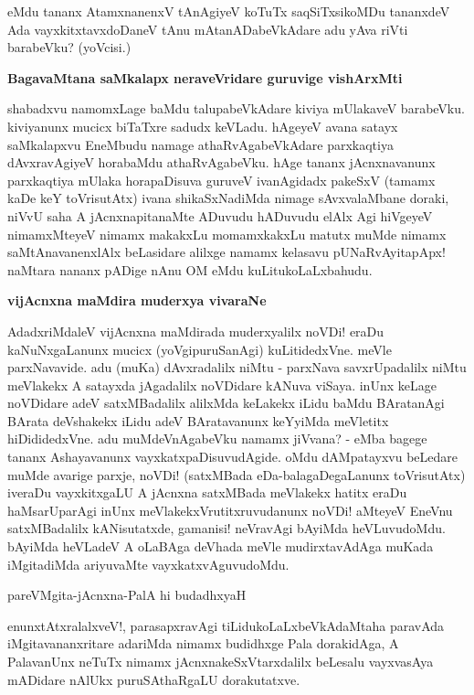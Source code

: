 \noindent
eMdu tananx AtamxnanenxV tAnAgiyeV koTuTx saqSiTxsikoMDu tananxdeV Ada vayxkitxtavxdoDaneV tAnu mAta\-nADa\-beVkAdare adu yAva riVti barabeVku? (yoVcisi.)

{\bigskip
\noindent
{\large\bf BagavaMtana saMkalapx neraveVridare guruvige vishArxMti}}\label{page71}
\medskip

\noindent
shabadxvu namomxLage baMdu talupabeVkAdare kiviya mUlakaveV barabeVku. kiviyanunx mucicx biTaTxre sadudx \-keVLadu. hAgeyeV avana satayx saMkalapxvu EneMbudu namage athaRvAgabeVkAdare parxkaqtiya dAvxra\-vAgiyeV horabaMdu athaRvAgabeVku. hAge tananx jAcnxnavanunx parxkaqtiya mUlaka horapaDisuva guru\-veV ivanAgidadx pakeSxV (tamamx kaDe keY toVrisutAtx) ivana shikaSxNadiMda nimage sAvxvalaMbane doraki, niVvU saha A jAcnxna\-pita\-naMte ADuvudu hADuvudu elAlx Agi hiVgeyeV nimamxMteyeV nimamx makakxLu momamx\-kakxLu matutx muMde nimamx saMtAnavanenxlAlx beLasidare alilxge namamx kelasavu pUNaRvAyitapApx! naMtara nananx pADige nAnu OM eMdu kuLitukoLaLxbahudu.

{\bigskip
\noindent
{\large\bf vijAcnxna maMdira muderxya vivaraNe}}
\medskip

\noindent
AdadxriMdaleV vijAcnxna maMdirada muderxyalilx noVDi! eraDu kaNuNxgaLanunx mucicx (yoVgipuruSa\-nAgi) kuLitidedxVne. meVle parxNavavide. adu (muKa) dAvxradalilx niMtu - parxNava savxrUpadalilx niMtu meVlakekx A satayxda jAgadalilx noVDidare kANuva viSaya. inUnx keLage noVDidare adeV satxMBadalilx alilxMda keLakekx iLidu baMdu BAratanAgi BArata deVshakekx iLidu adeV BAratavanunx keYyiMda meVletitx hiDididedxVne. adu muMdeVnAgabeVku namamx jiVvana? - eMba bagege tananx Ashayavanunx vayxkatxpaDisuvudAgide. oMdu dAMpatayxvu beLedare muMde avarige parxje, noVDi! (satxMBada eDa-balagaDegaLanunx toVrisutAtx) iveraDu vayxkitxgaLU A jAcnxna satxMBada meVlakekx hatitx eraDu haMsarUparAgi inUnx meVlakekxVrutitxruvudanunx noVDi! aMteyeV EneVnu satxMBadalilx kANisutatxde, gamanisi! neVravAgi bAyiMda heVLuvudoMdu. bAyiMda heVLadeV A oLaBAga deVhada meVle mudirxtavAdAga muKada iMgitadiMda ariyuvaMte vayxkatxvAguvu\-doMdu.

\begin{shloka}
pareVMgita-jAcnxna-PalA hi budadhxyaH\label{page72}
\end{shloka}

\noindent
enunxtAtxralalxveV!, parasapxravAgi tiLidukoLaLxbeVkAdaMtaha paravAda iMgitavananxritare adariMda nimamx bu\-didhxge Pala dorakidAga, A PalavanUnx neTuTx nimamx jAcnxnakeSxVtarxdalilx beLesalu vayxvasAya mADidare nAlUkx puruSAthaRgaLU dorakutatxve.


